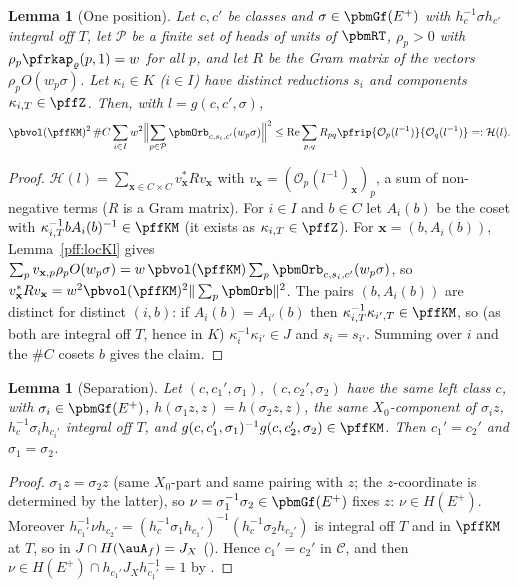 \documentclass[10pt]{amsart}
\newtheorem{lemma}[theorem]{Lemma}
\theoremstyle{definition}
\theoremstyle{remark}
\newcommand{\Rel}{\operatorname{Re}}
\begin{document}
\begin{lemma}[One position]\label{pff:headsum}
Let $c,c'$ be classes and $\sigma\in\pbmGf(E^+)$ with $h_c^{-1}\sigma h_{c'}$ integral off $T$, let $\mathcal P$ be
a finite set of heads of units of $\pbmRT$, $\rho_p>0$ with $\rho_p\pfrkap_\varrho(p,1)=w$ for all $p$, and let
$R$ be the Gram matrix of the vectors $\rho_pO(w_p\sigma)$. Let $\kappa_i\in K$ ($i\in I$) have distinct
reductions $s_i$ and components $\kappa_{i,T}\in\pffZ$. Then, with $l=g(c,c',\sigma)$,
\[
\pbvol(\pffKM)^2\,\#C\sum_{i\in I}w^2\Bigl\|\sum_{p\in\mathcal P}\pbmOrb_{c,s_i,c'}(w_p\sigma)\Bigr\|^2\le
\Rel\sum_{p,q}R_{pq}\pfrip{\mathcal O_p(l^{-1})}{\mathcal O_q(l^{-1})}=:\mathcal H(l).
\]
\end{lemma}
\begin{proof}
$\mathcal H(l)=\sum_{\mathbf x\in C\times C}v_{\mathbf x}^*Rv_{\mathbf x}$ with $v_{\mathbf x}=(\mathcal
O_p(l^{-1})_{\mathbf x})_p$, a sum of non-negative terms ($R$ is a Gram matrix). For $i\in I$ and $b\in C$ let
$A_i(b)$ be the coset with $\kappa_{i,T}^{-1}bA_i(b)^{-1}\in\pffKM$ (it exists as $\kappa_{i,T}\in\pffZ$). For
$\mathbf x=(b,A_i(b))$, Lemma~\ref{pff:locKl} gives $\sum_pv_{\mathbf x,p}\rho_pO(w_p\sigma)=w\,\pbvol(\pffKM)\sum_p
\pbmOrb_{c,s_i,c'}(w_p\sigma)$, so $v_{\mathbf x}^*Rv_{\mathbf x}=w^2\pbvol(\pffKM)^2\|\sum_p\pbmOrb\|^2$. The pairs
$(b,A_i(b))$ are distinct for distinct $(i,b)$: if $A_i(b)=A_{i'}(b)$ then $\kappa_{i,T}^{-1}\kappa_{i',T}\in
\pffKM$, so (as both are integral off $T$, hence in $K$) $\kappa_i^{-1}\kappa_{i'}\in J$ and $s_i=s_{i'}$. Summing
over $i$ and the $\#C$ cosets $b$ gives the claim.
\end{proof}

\begin{lemma}[Separation]\label{pff:sep}
Let $(c,c_1',\sigma_1)$, $(c,c_2',\sigma_2)$ have the same left class $c$, with $\sigma_i\in\pbmGf(E^+)$,
$h(\sigma_1z,z)=h(\sigma_2z,z)$, the same $X_0$-component of $\sigma_iz$, $h_c^{-1}\sigma_ih_{c_i'}$ integral off
$T$, and $g(c,c_1',\sigma_1)^{-1}g(c,c_2',\sigma_2)\in\pffKM$. Then $c_1'=c_2'$ and $\sigma_1=\sigma_2$.
\end{lemma}
\begin{proof}
$\sigma_1z=\sigma_2z$ (same $X_0$-part and same pairing with $z$; the $z$-coordinate is determined by the
latter), so $\nu=\sigma_1^{-1}\sigma_2\in\pbmGf(E^+)$ fixes $z$: $\nu\in H(E^+)$. Moreover $h_{c_1'}^{-1}\nu
h_{c_2'}=(h_c^{-1}\sigma_1h_{c_1'})^{-1}(h_c^{-1}\sigma_2h_{c_2'})$ is integral off $T$ and in $\pffKM$ at $T$, so in
$J\cap H(\auA_f)=J_X$ ({\cite[Lemma~2.1]{P51}}). Hence $c_1'=c_2'$ in $\mathcal C$, and then $\nu\in H(E^+)\cap
h_{c_1'}J_Xh_{c_1'}^{-1}=1$ by {\cite[Lemma~14.5]{P46}}.
\end{proof}
\end{document}
